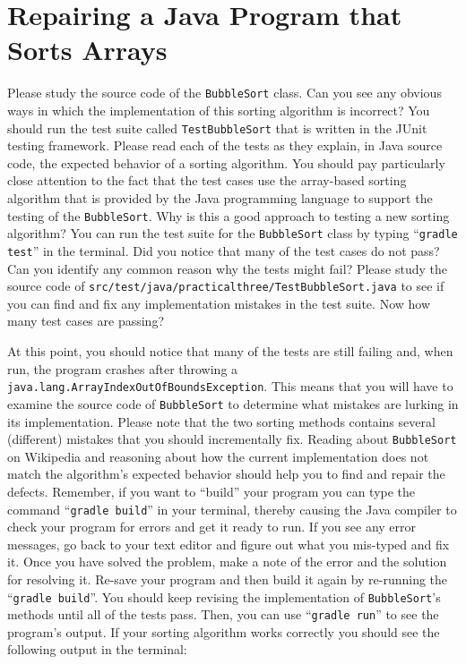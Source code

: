 \documentclass[11pt]{article}
\newcommand{\mainprogram}{\lstinline{BubbleSort}}
\newcommand{\testprogram}{\lstinline{TestBubbleSort}}
\newcommand{\testprogramsource}{\lstinline{src/test/java/practicalthree/TestBubbleSort.java}}
\newcommand{\gradlebuild}{\command{gradle build}}
\newcommand{\gradletest}{\command{gradle test}}
\newcommand{\gradlerun}{\command{gradle run}}
\newcommand{\command}[1]{``\lstinline{#1}''}
\newcommand{\program}[1]{\lstinline{#1}}
\newcommand{\step}[1]{``{#1}''}
\begin{document}
\section*{Repairing a Java Program that Sorts Arrays}

Please study the source code of the \mainprogram{} class. Can you see any
obvious ways in which the implementation of this sorting algorithm is incorrect?
You should run the test suite called \testprogram{} that is written in the JUnit
testing framework. Please read each of the tests as they explain, in Java source
code, the expected behavior of a sorting algorithm. You should pay particularly
close attention to the fact that the test cases use the array-based sorting
algorithm that is provided by the Java programming language to support the
testing of the \mainprogram{}. Why is this a good approach to testing a new
sorting algorithm? You can run the test suite for the \mainprogram{} class by
typing \gradletest{} in the terminal. Did you notice that many of the test cases
do not pass? Can you identify any common reason why the tests might fail? Please
study the source code of \testprogramsource{} to see if you can find and fix any
implementation mistakes in the test suite. Now how many test cases are passing?

At this point, you should notice that many of the tests are still failing and,
when run, the program crashes after throwing a
\program{java.lang.ArrayIndexOutOfBoundsException}. This means that you will
have to examine the source code of \mainprogram{} to determine what mistakes are
lurking in its implementation. Please note that the two sorting methods contains
several (different) mistakes that you should incrementally fix. Reading about
\mainprogram{} on Wikipedia and reasoning about how the current implementation
does not match the algorithm's expected behavior should help you to find and
repair the defects. Remember, if you want to \step{build} your program you can
type the command \gradlebuild{} in your terminal, thereby causing the Java
compiler to check your program for errors and get it ready to run. If you see
any error messages, go back to your text editor and figure out what you
mis-typed and fix it. Once you have solved the problem, make a note of the error
and the solution for resolving it. Re-save your program and then build it again
by re-running the \gradlebuild{}. You should keep revising the implementation of
\mainprogram's methods until all of the tests pass. Then, you can use
\gradlerun{} to see the program's output. If your sorting algorithm works
correctly you should see the following output in the terminal:
\end{document}
